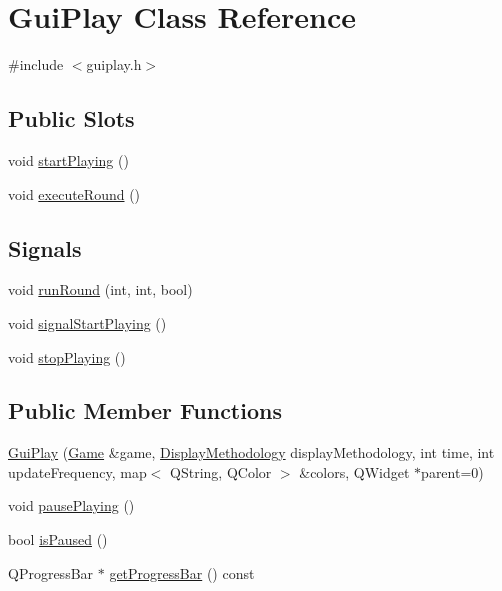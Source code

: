 \hypertarget{class_gui_play}{
\section{GuiPlay Class Reference}
\label{class_gui_play}
}


{\ttfamily \#include $<$guiplay.h$>$}

\subsection*{Public Slots}
\begin{DoxyCompactItemize}
\item 
void \hyperlink{class_gui_play_a3ee52f6eafb9e770ac3c7c08338de5a0}{startPlaying} ()
\item 
void \hyperlink{class_gui_play_a56e08410e19c420ee0b25864178c406c}{executeRound} ()
\end{DoxyCompactItemize}
\subsection*{Signals}
\begin{DoxyCompactItemize}
\item 
void \hyperlink{class_gui_play_a84eda0efc5b7998010283eddfa9cf6b8}{runRound} (int, int, bool)
\item 
void \hyperlink{class_gui_play_a6cb81bd99ab909e863217bb5696455ab}{signalStartPlaying} ()
\item 
void \hyperlink{class_gui_play_abc7f6a475d57e71822b0dff2851497ad}{stopPlaying} ()
\end{DoxyCompactItemize}
\subsection*{Public Member Functions}
\begin{DoxyCompactItemize}
\item 
\hyperlink{class_gui_play_a763720422125bc6ddde93472bc161eee}{GuiPlay} (\hyperlink{class_game}{Game} \&game, \hyperlink{guicommon_8h_ab73f4a618a1a86d78e9cc82ff1c376df}{DisplayMethodology} displayMethodology, int time, int updateFrequency, map$<$ QString, QColor $>$ \&colors, QWidget $\ast$parent=0)
\item 
void \hyperlink{class_gui_play_a28ceab1b46e252e30c9f7858450b0de9}{pausePlaying} ()
\item 
bool \hyperlink{class_gui_play_ae67f437ee24b0bc1758e2176b9c119d5}{isPaused} ()
\item 
QProgressBar $\ast$ \hyperlink{class_gui_play_aeb3c459efc257be1e8dd8846189fb98c}{getProgressBar} () const 
\end{DoxyCompactItemize}


